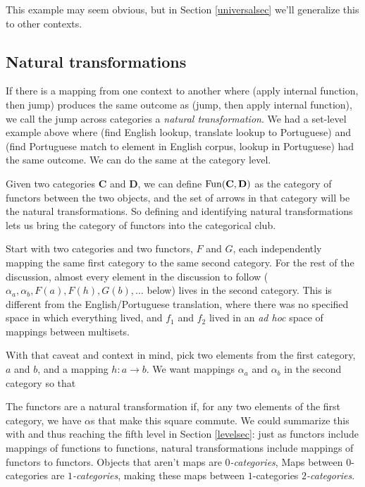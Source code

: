 \documentclass[11pt]{article}
\begin{document}
This example may seem obvious, but in Section \ref{universalsec} we'll generalize this
to other contexts.

\subsection{Natural transformations}
If there is a mapping from one context to another where (apply internal function,
then jump) produces the same outcome as (jump, then apply internal function), we call
the jump across categories a {\em natural transformation}. We had a set-level example
above where (find English lookup, translate lookup to Portuguese) and (find Portuguese
match to element in English corpus, lookup in Portuguese) had the same outcome. We can do
the same at the category level.

Given two categories {\bf C} and {\bf D}, we can define ${\rm Fun}({\bf C}, {\bf D})$ as
the category of functors between the two objects, and the set of arrows in that category
will be the natural transformations. So defining and identifying natural
transformations lets us bring the category of functors into the categorical club.

Start with two categories and two functors, $F$ and $G$, each independently mapping the same first
category to the same second category. For the rest of the discussion, almost every element in the discussion
to follow ($\alpha_a, \alpha_b, F(a), F(h), G(b), \dots$ below) lives in the second category.
This is different from the English/Portuguese translation, where there was no specified
space in which everything lived, and $f_1$ and $f_2$ lived in an {\em ad hoc} space of
mappings between multisets.

With that caveat and context in mind, pick two elements from the first category, $a$
and $b$, and a mapping $h:a\to b$.  We want mappings $\alpha_a$ and $\alpha_b$ in the
second category so that


The functors are a natural transformation if, for any two elements of the first category,
we have $\alpha$s that make this square commute. We could summarize this with
and thus reaching the fifth level in Section \ref{levelsec}: just as
functors include mappings of functions to functions, natural transformations include
mappings of functors to functors. Objects that aren't maps are {\em $0$-categories},
Maps between $0$-categories are {\em $1$-categories}, making these maps between 
$1$-categories {\em $2$-categories}.
\end{document}
